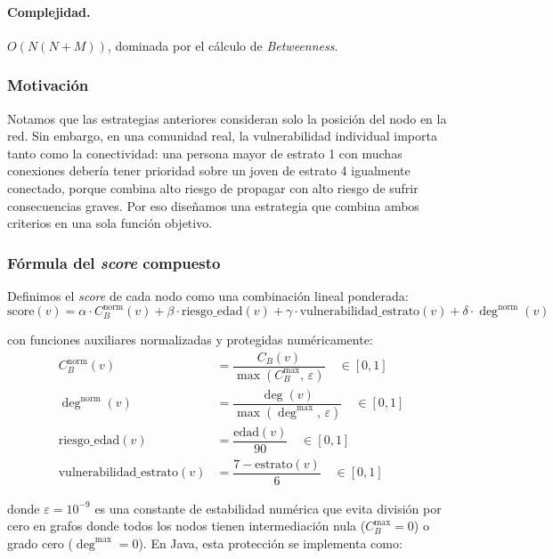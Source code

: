\documentclass[spanish,notitlepage,letterpaper, 12pt]{article}
\begin{document}
\paragraph{Complejidad.} $O(N(N+M))$, dominada por el c\'alculo de \textit{Betweenness}.

\subsubsection{Motivaci\'on}

Notamos que las estrategias anteriores consideran solo la posici\'on del nodo en la red. Sin embargo, en una comunidad real, la vulnerabilidad individual importa tanto como la conectividad: una persona mayor de estrato 1 con muchas conexiones deber\'ia tener prioridad sobre un joven de estrato 4 igualmente conectado, porque combina alto riesgo de propagar con alto riesgo de sufrir consecuencias graves. Por eso dise\~namos una estrategia que combina ambos criterios en una sola funci\'on objetivo.

\subsubsection{F\'ormula del \textit{score} compuesto}

Definimos el \textit{score} de cada nodo como una combinaci\'on lineal ponderada:
\begin{equation}
\boxed{
\text{score}(v) = \alpha \cdot C_B^{\text{norm}}(v) + \beta \cdot \text{riesgo\_edad}(v) + \gamma \cdot \text{vulnerabilidad\_estrato}(v) + \delta \cdot \deg^{\text{norm}}(v)
}
\label{eq:score_hibrido}
\end{equation}

con funciones auxiliares normalizadas y protegidas num\'ericamente:
\begin{align*}
C_B^{\text{norm}}(v) &= \dfrac{C_B(v)}{\max(C_B^{\max},\,\varepsilon)} \quad \in [0, 1] \\[6pt]
\deg^{\text{norm}}(v) &= \dfrac{\deg(v)}{\max(\deg^{\max},\,\varepsilon)} \quad \in [0, 1] \\[6pt]
\text{riesgo\_edad}(v) &= \dfrac{\text{edad}(v)}{90} \quad \in [0, 1] \\[6pt]
\text{vulnerabilidad\_estrato}(v) &= \dfrac{7 - \text{estrato}(v)}{6} \quad \in [0, 1]
\end{align*}

donde $\varepsilon = 10^{-9}$ es una constante de estabilidad num\'erica que evita divisi\'on por cero en grafos donde todos los nodos tienen intermediaci\'on nula ($C_B^{\max} = 0$) o grado cero ($\deg^{\max} = 0$). En Java, esta protecci\'on se implementa como:
\end{document}
